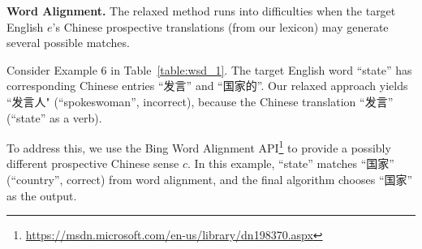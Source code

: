 \begin{CJK}{UTF8}{gbsn}


{\bf Word Alignment.}  The relaxed method runs into difficulties when
the target English $e$'s Chinese prospective translations (from our
lexicon) may generate several possible matches.  

Consider Example 6 in Table~\ref{table:wsd_1}.  The target English
word ``state'' has corresponding Chinese entries ``发言'' and ``国家的''.
Our relaxed approach yields ``发言人" (``spokeswoman'', incorrect),
because the Chinese translation ``发言'' (``state'' as a verb).  

To address this, we use the Bing Word Alignment
API\footnote{\url{https://msdn.microsoft.com/en-us/library/dn198370.aspx}}
to provide a possibly different prospective Chinese sense $c$.  In
this example, ``state'' matches ``国家'' (``country'', correct) from
word alignment, and the final algorithm chooses ``国家'' as the
output.




\end{CJK}
